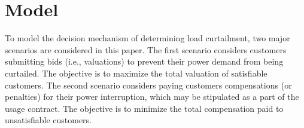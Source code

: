 \vspace{-5pt}
\section{Model} \label{sec:model}




To model the decision mechanism of determining load curtailment, two major scenarios are considered in this paper.
The first scenario considers customers submitting bids (i.e., valuations) to prevent their power demand from being curtailed. The objective is to maximize the total valuation of satisfiable customers. The second scenario considers paying customers compensations (or penalties) for their power interruption, which may be stipulated as a part of the usage contract. The objective is to minimize the total compensation paid to unsatisfiable customers. 

